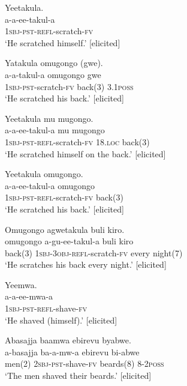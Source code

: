 \documentclass[output=paper,colorlinks,citecolor=brown,
]{langscibook}
\begin{document}
\z 
\z

\ea\label{ex:Witzlack:11}
\ea  \label{ex:Witzlack:11a}
	\glll   Yeetakula.\\
            a-a-ee-takul-a \\
		\textsc{1sbj}-\textsc{pst}-\textsc{refl}-scratch-\textsc{fv}\\
		\glt	‘He scratched himself.’ [elicited]

\ex \label{ex:Witzlack:11b}
	\glll Yatakula omugongo (gwe).\\
	    a-a-takul-a 			omugongo 	gwe\\
		\textsc{1sbj}-\textsc{pst}-scratch-\textsc{fv}	back(3) 		3.1\textsc{poss}\\
		\glt ‘He scratched his back.’ [elicited]

\ex \label{ex:Witzlack:11c}
	\glll Yeetakula mu mugongo.\\
	    a-a-ee-takul-a 			mu 		mugongo\\
	\textsc{1sbj}-\textsc{pst}-\textsc{refl}-scratch-\textsc{fv} 	18.\textsc{loc}	back(3)\\
		\glt ‘He scratched himself on the back.’ [elicited]

\ex \label{ex:Witzlack:11d}
	\glll Yeetakula omugongo.\\
	    a-a-ee-takul-a 			omugongo\\
		\textsc{1sbj}-\textsc{pst}-\textsc{refl}-scratch-\textsc{fv}	back(3)\\
		\glt ‘He scratched his back.’ [elicited]

\ex \label{ex:Witzlack:11e}
	\glll Omugongo agwetakula buli kiro.\\
	    omugongo	a-gu-ee-takul-a			buli		kiro\\
		back(3)		\textsc{1sbj}-3\textsc{obj}-\textsc{refl}-scratch-\textsc{fv}	every	night(7)\\
		\glt ‘He scratches his back every night.’ [elicited]

\z 
\z

\ea\label{ex:Witzlack:12}
\ea \label{ex:Witzlack:12a}
    \glll Yeemwa.\\
    a-a-ee-mwa-a\\
    \textsc{1sbj}-\textsc{pst}-\textsc{refl}-shave-\textsc{fv}\\
    \glt ‘He shaved (himself).’ [elicited]

\ex \label{ex:Witzlack:12b}
    \glll Abasajja baamwa ebirevu byabwe.\\
    a-basajja ba-a-mw-a ebirevu bi-abwe\\
    men(2) 	\textsc{2sbj}-\textsc{pst}-shave-\textsc{fv} beards(8) 	\textsc{8-2poss}\\
    \glt ‘The men shaved their beards.’ [elicited]
\end{document}
